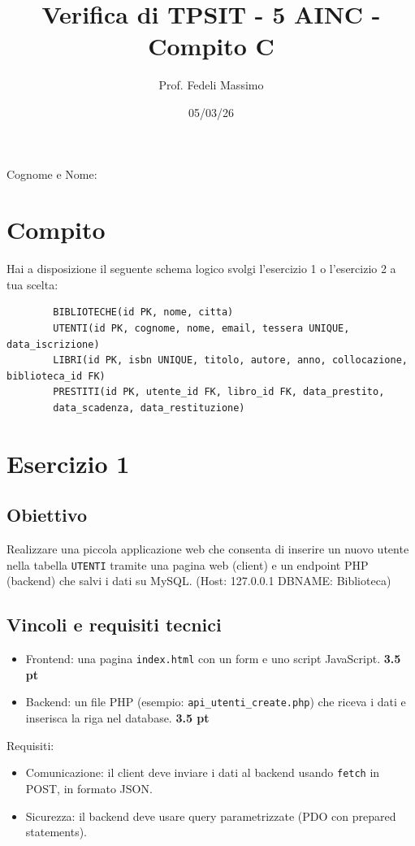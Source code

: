 \documentclass[a4paper,12pt]{article}
\title{Verifica di TPSIT - 5 AINC - Compito C}
\author{Prof. Fedeli Massimo}
\date{05/03/26}
\begin{document}
	
	\maketitle
		Cognome e Nome: 
	\section*{Compito}
	
	Hai a disposizione il seguente schema logico svolgi l'esercizio 1 o l'esercizio 2 a tua scelta:
	
	\begin{verbatim}
		BIBLIOTECHE(id PK, nome, citta)
		UTENTI(id PK, cognome, nome, email, tessera UNIQUE, data_iscrizione)
		LIBRI(id PK, isbn UNIQUE, titolo, autore, anno, collocazione, biblioteca_id FK)
		PRESTITI(id PK, utente_id FK, libro_id FK, data_prestito,
		data_scadenza, data_restituzione)
	\end{verbatim}
	
	\section*{Esercizio 1}
	
	\subsection*{Obiettivo}
	
	Realizzare una piccola applicazione web che consenta di inserire un nuovo utente
	nella tabella \texttt{UTENTI} tramite una pagina web (client) e un endpoint PHP
	(backend) che salvi i dati su MySQL. (Host: 127.0.0.1  DBNAME: Biblioteca)
	
	\subsection*{Vincoli e requisiti tecnici}
	
	\begin{itemize}
		\item Frontend: una pagina \texttt{index.html} con un form e uno script
		JavaScript. \textbf{3.5 pt}
		\item Backend: un file PHP (esempio: \texttt{api\_utenti\_create.php}) che
		riceva i dati e inserisca la riga nel database. \textbf{3.5 pt}
	\end{itemize}
	
	Requisiti:
	\begin{itemize}
		\item Comunicazione: il client deve inviare i dati al backend usando
		\texttt{fetch} in POST, in formato JSON.
		\item Sicurezza: il backend deve usare query parametrizzate (PDO con prepared
		statements). 
	\end{itemize}
	
\end{document}
